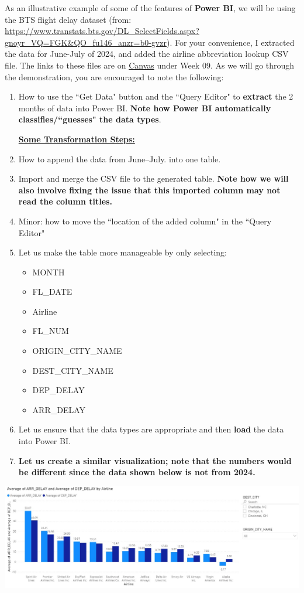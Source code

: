 \documentclass[letterpaper,addpoints, 11pt]{exam}
\begin{document}
\begin{questions}
\question[0] As an illustrative example of some of the features of \textbf{Power BI}, we will be using the BTS flight delay dataset (from: \url{https://www.transtats.bts.gov/DL_SelectFields.aspx?gnoyr_VQ=FGK&QO_fu146_anzr=b0-gvzr}). For your convenience, I extracted the data for June-July of 2024, and  added the airline abbreviation lookup CSV file. The links to these files are on \underline{Canvas} under Week 09. As we will go through the demonstration, you are encouraged to note the following: 
\begin{enumerate}[label=(\Alph*)]
	\item How to use the ``Get Data" button and the ``Query Editor" to \textbf{extract} the 2 months of data into Power BI. \textbf{Note how Power BI automatically classifies/``guesses" the data types}.\\
	\bigskip \bigskip \bigskip \bigskip
	
	\noindent \underline{\textbf{Some Transformation Steps:}}
	\item How to append the data from June--July. into one table.
	\bigskip \bigskip \bigskip  
	\item Import and merge the CSV file to the generated table. \textbf{Note how we will also involve fixing the issue that this imported column may not read the column titles.}
	\bigskip \bigskip
	\item Minor: how to move the ``location of the added column" in the ``Query Editor"
	\bigskip
	\item Let us make the table more manageable by only selecting: 
	\begin{itemize}[nosep]
		\item MONTH
		\item FL\_DATE
		\item Airline
		\item FL\_NUM
		\item ORIGIN\_CITY\_NAME
		\item DEST\_CITY\_NAME
		\item DEP\_DELAY 
		\item ARR\_DELAY
	\end{itemize}
	\item Let us ensure that the data types are appropriate and then \textbf{load} the data into Power BI.
	\bigskip \bigskip
	\item \textbf{Let us create a similar visualization; note that the numbers would be different since the data shown below is not from 2024.}	
\end{enumerate}
 	
{\centering \includegraphics[width=\textwidth,frame]{../../figures/powerbi}}

\end{questions}
\end{document}
